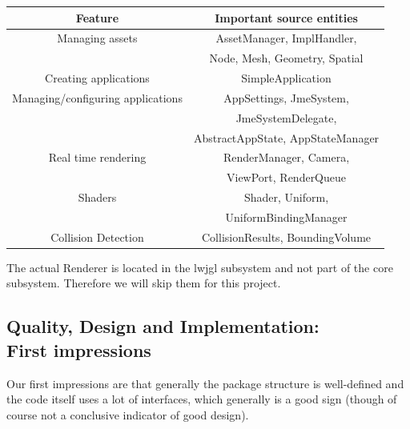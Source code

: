 \documentclass[a4paper, 10pt]{article}
\begin{document}
\begin{tabular}{| c | c |}
  \hline
  \textbf{Feature}                  & \textbf{Important source entities} \\
  \hline
  \hline
  Managing assets                   & AssetManager, ImplHandler, \\
				    & Node, Mesh, Geometry, Spatial \\
  \hline
  Creating applications             & SimpleApplication \\
  \hline
  Managing/configuring applications & AppSettings, JmeSystem, \\
                                    & JmeSystemDelegate, \\
                                    & AbstractAppState, AppStateManager \\
  \hline
  Real time rendering               & RenderManager, Camera,  \\
                                    & ViewPort, RenderQueue \\
  \hline
  Shaders                           & Shader, Uniform, \\
                                    & UniformBindingManager \\
  \hline
  Collision Detection		    & CollisionResults, BoundingVolume\\
  \hline
\end{tabular}
\newline
\newline
The actual Renderer is located in the lwjgl subsystem 
and not part of the core subsystem. 
Therefore we will skip them for this project.
 

\subsection{Quality, Design and Implementation:\\First impressions}
\label{sec:first_impressions}



Our first impressions are that generally the package structure is
well-defined and the code itself uses a lot of interfaces, which
generally is a good sign (though of course not a conclusive indicator
of good design).
\end{document}
